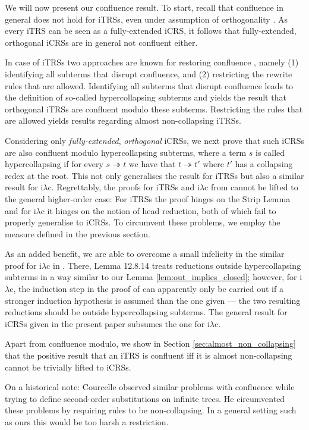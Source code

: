 \documentclass{LMCS}
\theoremstyle{plain}
\theoremstyle{definition}
\newcommand{\trewt}{\twoheadrightarrow}
\newcommand{\iLC}{i$\lambda$c\xspace}
\begin{document}
\noindent We will now present our confluence result. To start, recall
that confluence in general does not hold for iTRSs, even under
assumption of orthogonality \cite{KKSV95}. As every iTRS can be seen
as a fully-extended iCRS, it follows that fully-extended, orthogonal
iCRSs are in general not confluent either.

In case of iTRSs two approaches are known for restoring confluence \cite{KKSV95}, namely (1) identifying all subterms that disrupt confluence, and (2) restricting the rewrite rules that are allowed. Identifying all subterms that disrupt confluence leads to the definition of so-called hypercollapsing subterms and yields the result that orthogonal iTRSs are confluent modulo these subterms. Restricting the rules that are allowed yields results regarding almost non-collapsing iTRSs.

Considering only  \emph{fully-extended}, \emph{orthogonal} iCRSs, we next prove that such iCRSs are also confluent modulo hypercollapsing subterms, where a term $s$ is called hypercollapsing if for every $s \trewt t$ we have that $t \trewt t'$ where $t'$ has a collapsing redex at the root. This not only generalises the result for iTRSs but also a similar result for \iLC \cite{KKSV97}. Regrettably, the proofs for iTRSs and \iLC from \cite{T03_KV} cannot be lifted to the general higher-order case: For iTRSs the proof hinges on the Strip Lemma and for \iLC it hinges on the notion of head reduction, both of which fail to properly generalise to iCRSs. To circumvent these problems, we employ the measure defined in the previous section.

As an added benefit, we are able to overcome a small infelicity in the similar proof for \iLC in \cite{T03_KV}. There, Lemma 12.8.14 treats reductions 
outside hypercollapsing subterms in a way similar to our Lemma \ref{lem:out_implies_closed}; however, for \iLC, the induction step in the proof of
\cite{T03_KV} can apparently only be carried out if a stronger induction hypothesis is assumed than the one given --- the two resulting reductions should be outside hypercollapsing subterms. The general result for iCRSs 
given in the present paper subsumes the one for \iLC.

Apart from confluence modulo, we show in Section \ref{sec:almost_non_collapsing} that the positive result that an iTRS is confluent if{f} it is almost non-collapsing cannot be trivially lifted to iCRSs.

\begin{rem}
On a historical note: Courcelle \cite{C83} observed similar problems with confluence while trying to define second-order substitutions on infinite trees. He circumvented these problems by requiring rules to be non-collapsing. In a general setting such as ours this would be too harsh a restriction.
\end{rem}
\end{document}
